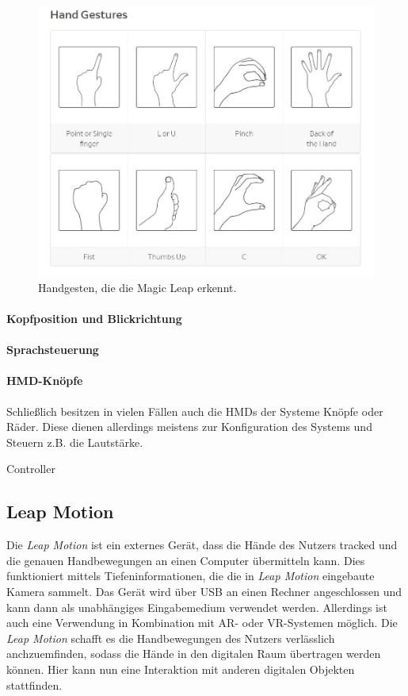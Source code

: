 \begin{figure}
	\centering
	\includegraphics[width=0.7\linewidth]{images/magicleapGestures.jpg}
	\caption{Handgesten, die die Magic Leap erkennt.}
	\label{img:magicGestures}
\end{figure}

\paragraph{Kopfposition und Blickrichtung}

\paragraph{Sprachsteuerung}
\paragraph{HMD-Knöpfe}
Schließlich besitzen in vielen Fällen auch die HMDs der Systeme Knöpfe oder Räder. Diese dienen allerdings meistens zur Konfiguration des Systems und Steuern z.B. die Lautstärke.

Controller
\subsection{Leap Motion}

Die \textit{Leap Motion} ist ein externes Gerät, dass die Hände des Nutzers tracked und die genauen Handbewegungen an einen Computer übermitteln kann. 
Dies funktioniert mittels Tiefeninformationen, die die in \textit{Leap Motion} eingebaute Kamera sammelt. Das Gerät wird über USB an einen Rechner angeschlossen und kann dann als unabhängiges Eingabemedium verwendet werden. Allerdings ist auch eine Verwendung in Kombination mit AR- oder VR-Systemen möglich. 
Die \textit{Leap Motion} schafft es die Handbewegungen des Nutzers verlässlich anchzuemfinden, sodass die Hände in den digitalen Raum übertragen werden können. Hier kann nun eine Interaktion mit anderen digitalen Objekten stattfinden. 

